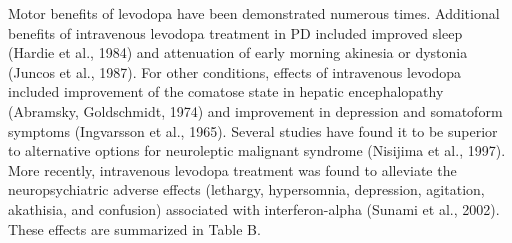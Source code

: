 Motor benefits of levodopa have been demonstrated numerous times. Additional benefits of intravenous levodopa treatment in PD included improved sleep (Hardie et al., 1984) and attenuation of early morning akinesia or dystonia (Juncos et al., 1987).  For other conditions, effects of intravenous levodopa included improvement of the comatose state in hepatic encephalopathy (Abramsky, Goldschmidt, 1974) and improvement in depression and somatoform symptoms (Ingvarsson et al., 1965).  Several studies have found it to be superior to alternative options for neuroleptic malignant syndrome (Nisijima et al., 1997).  More recently, intravenous levodopa treatment was found to alleviate the neuropsychiatric adverse effects (lethargy, hypersomnia, depression, agitation, akathisia, and confusion) associated with interferon-alpha (Sunami et al., 2002). These effects are summarized in Table B.